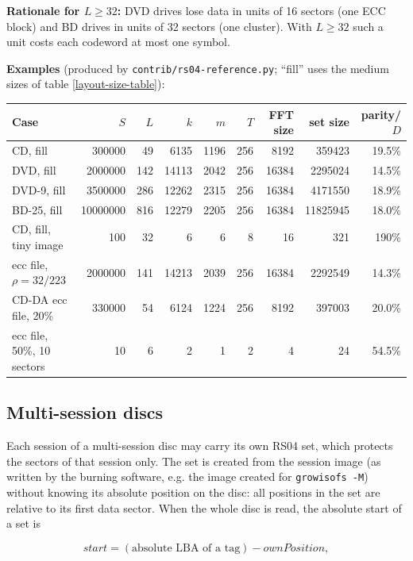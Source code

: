 \medskip

{\bf Rationale for $L \ge 32$:} DVD drives lose data in units of 16 sectors
(one ECC block) and BD drives in units of 32 sectors (one cluster). With
$L \ge 32$ such a unit costs each codeword at most one symbol.

\medskip

{\bf Examples} (produced by {\tt contrib/rs04-reference.py}; ``fill'' uses
the medium sizes of table \ref{layout-size-table}):

\medskip
{\footnotesize
\begin{tabular}{|l|r|r|r|r|r|r|r|r|}
\hline
Case & $S$ & $L$ & $k$ & $m$ & $T$ & FFT size & set size & parity/$D$ \\
\hline
CD, fill & 300000 & 49 & 6135 & 1196 & 256 & 8192 & 359423 & 19.5\% \\
DVD, fill & 2000000 & 142 & 14113 & 2042 & 256 & 16384 & 2295024 & 14.5\% \\
DVD-9, fill & 3500000 & 286 & 12262 & 2315 & 256 & 16384 & 4171550 & 18.9\% \\
BD-25, fill & 10000000 & 816 & 12279 & 2205 & 256 & 16384 & 11825945 & 18.0\% \\
CD, fill, tiny image & 100 & 32 & 6 & 6 & 8 & 16 & 321 & 190\% \\
ecc file, $\rho = 32/223$ & 2000000 & 141 & 14213 & 2039 & 256 & 16384 & 2292549 & 14.3\% \\
CD-DA ecc file, 20\% & 330000 & 54 & 6124 & 1224 & 256 & 8192 & 397003 & 20.0\% \\
ecc file, 50\%, 10 sectors & 10 & 6 & 2 & 1 & 2 & 4 & 24 & 54.5\% \\
\hline
\end{tabular}
}

\subsection{Multi-session discs}
\label{rs04-sessions}

Each session of a multi-session disc may carry its own RS04 set, which
protects the sectors of that session only. The set is created from the
session image (as written by the burning software, e.g. the image created
for {\tt growisofs -M}) without knowing its absolute position on the disc:
all positions in the set are relative to its first data sector. When the
whole disc is read, the absolute start of a set is

\[ start = (\mbox{absolute LBA of a tag}) - ownPosition , \]

